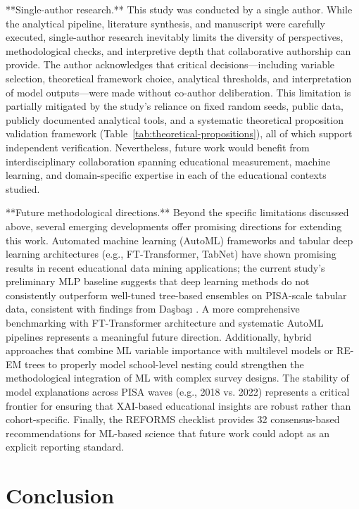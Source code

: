 \documentclass[pdflatex,sn-mathphys-ay]{sn-jnl}
\begin{document}
**Single-author research.** This study was conducted by a single author. While the analytical pipeline, literature synthesis, and manuscript were carefully executed, single-author research inevitably limits the diversity of perspectives, methodological checks, and interpretive depth that collaborative authorship can provide. The author acknowledges that critical decisions---including variable selection, theoretical framework choice, analytical thresholds, and interpretation of model outputs---were made without co-author deliberation. This limitation is partially mitigated by the study's reliance on fixed random seeds, public data, publicly documented analytical tools, and a systematic theoretical proposition validation framework (Table~\ref{tab:theoretical-propositions}), all of which support independent verification. Nevertheless, future work would benefit from interdisciplinary collaboration spanning educational measurement, machine learning, and domain-specific expertise in each of the educational contexts studied.

**Future methodological directions.** Beyond the specific limitations discussed above, several emerging developments offer promising directions for extending this work. Automated machine learning (AutoML) frameworks and tabular deep learning architectures (e.g., FT-Transformer, TabNet) have shown promising results in recent educational data mining applications; the current study's preliminary MLP baseline suggests that deep learning methods do not consistently outperform well-tuned tree-based ensembles on PISA-scale tabular data, consistent with findings from Daşbaşı \citep{Dasbasi_2025_dynamic}. A more comprehensive benchmarking with FT-Transformer architecture and systematic AutoML pipelines represents a meaningful future direction. Additionally, hybrid approaches that combine ML variable importance with multilevel models \citep{Soares_2024_brazil} or RE-EM trees \citep{Liu_2024_REEM} to properly model school-level nesting could strengthen the methodological integration of ML with complex survey designs. The stability of model explanations across PISA waves (e.g., 2018 vs. 2022) \citep{Tiukhova_2025} represents a critical frontier for ensuring that XAI-based educational insights are robust rather than cohort-specific. Finally, the REFORMS checklist \citep{Kapoor_2024_REFORMS} provides 32 consensus-based recommendations for ML-based science that future work could adopt as an explicit reporting standard.

\FloatBarrier
\section{Conclusion}
\end{document}
